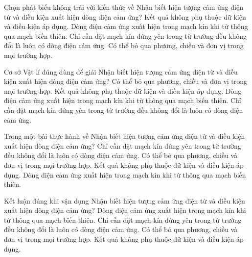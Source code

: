 \begin{ex}
Chọn phát biểu không trái với kiến thức về Nhận biết hiện tượng cảm ứng điện từ và điều kiện xuất hiện dòng điện cảm ứng?
\choice
{Kết quả không phụ thuộc dữ kiện và điều kiện áp dụng.}
{\True Dòng điện cảm ứng xuất hiện trong mạch kín khi từ thông qua mạch biến thiên.}
{Chỉ cần đặt mạch kín đứng yên trong từ trường đều không đổi là luôn có dòng điện cảm ứng.}
{Có thể bỏ qua phương, chiều và đơn vị trong mọi trường hợp.}
\end{ex}

\begin{ex}
Cơ sở Vật lí đúng dùng để giải Nhận biết hiện tượng cảm ứng điện từ và điều kiện xuất hiện dòng điện cảm ứng?
\choice
{Có thể bỏ qua phương, chiều và đơn vị trong mọi trường hợp.}
{Kết quả không phụ thuộc dữ kiện và điều kiện áp dụng.}
{\True Dòng điện cảm ứng xuất hiện trong mạch kín khi từ thông qua mạch biến thiên.}
{Chỉ cần đặt mạch kín đứng yên trong từ trường đều không đổi là luôn có dòng điện cảm ứng.}
\end{ex}

\begin{ex}
Trong một bài thực hành về Nhận biết hiện tượng cảm ứng điện từ và điều kiện xuất hiện dòng điện cảm ứng?
\choice
{Chỉ cần đặt mạch kín đứng yên trong từ trường đều không đổi là luôn có dòng điện cảm ứng.}
{Có thể bỏ qua phương, chiều và đơn vị trong mọi trường hợp.}
{Kết quả không phụ thuộc dữ kiện và điều kiện áp dụng.}
{\True Dòng điện cảm ứng xuất hiện trong mạch kín khi từ thông qua mạch biến thiên.}
\end{ex}

\begin{ex}
Kết luận đúng khi vận dụng Nhận biết hiện tượng cảm ứng điện từ và điều kiện xuất hiện dòng điện cảm ứng?
\choice
{\True Dòng điện cảm ứng xuất hiện trong mạch kín khi từ thông qua mạch biến thiên.}
{Chỉ cần đặt mạch kín đứng yên trong từ trường đều không đổi là luôn có dòng điện cảm ứng.}
{Có thể bỏ qua phương, chiều và đơn vị trong mọi trường hợp.}
{Kết quả không phụ thuộc dữ kiện và điều kiện áp dụng.}
\end{ex}

